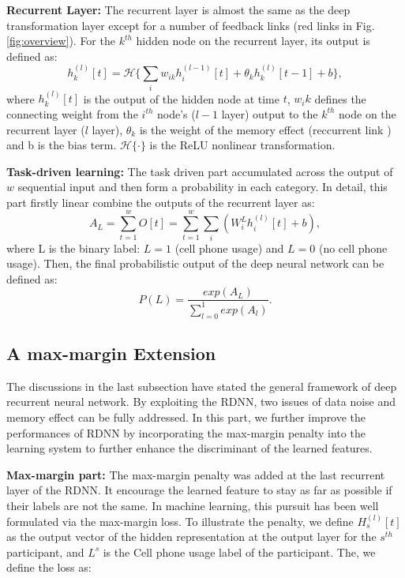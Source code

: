 \documentclass[journal]{IEEEtran}
\begin{document}
\textbf{Recurrent Layer:} The recurrent layer is almost the same as the deep transformation layer except for a number of feedback links (red links in Fig.\ref{fig:overview}).  For the $k^{th}$ hidden node on the recurrent layer, its output is defined as:
\begin{equation}
h^{(l)}_k[t]=\mathcal{H}\{\sum_i w_{ik} h^{(l-1)}_i[t]+\theta_k h^{(l)}_k[t-1] +b\},
\label{eqs:recurrent}
\end{equation}
where $h^{(l)}_k[t]$ is the output of the hidden node at time $t$, $w_ik$ defines the connecting weight from the $i^{th}$ node's ($l-1$ layer) output to the $k^{th}$ node on the recurrent layer ($l$ layer), $\theta_k$ is the weight of the memory effect (reccurrent link ) and b is the bias term. $\mathcal{H}\{\cdot\}$ is the ReLU nonlinear transformation.

\textbf{Task-driven learning:} The task driven part accumulated across the output of $w$ sequential input and then form a probability in each category. In detail, this part firstly linear combine the outputs of the recurrent layer as:
\begin{equation}
A_L=\sum_{t=1}^w O[t]=\sum_{t=1}^w\sum_i (W^{L}_i h^{(l)}_i[t]+b),
\end{equation}
where L is the binary label: $L=1$ (cell phone usage) and $L=0$ (no cell phone usage). Then, the final probabilistic output of the deep neural network can be defined as:
\begin{equation}
P(L)=\frac{exp(A_{L})}{\sum_{l=0}^{1}exp(A_l)}.
\end{equation}


\subsection{A max-margin Extension}
The discussions in the last subsection have stated the general framework of deep recurrent neural network. By exploiting the RDNN, two issues of data noise and memory effect can be fully addressed. In this part, we further improve the performances of RDNN by incorporating the max-margin penalty into  the learning system to further enhance the discriminant of the learned features.



\textbf{Max-margin part:} The max-margin penalty was added at the last recurrent layer of the RDNN. It encourage the learned feature to stay as far as possible if their labels are not the same. In machine learning, this pursuit has been well formulated via the max-margin loss.  To illustrate the penalty, we define $H^{(l)}_s[t]$ as the output vector of the hidden representation at the output layer for the $s^{th}$ participant, and $L^s$ is the Cell phone usage label of the participant.  The, we define the loss as:
\end{document}
